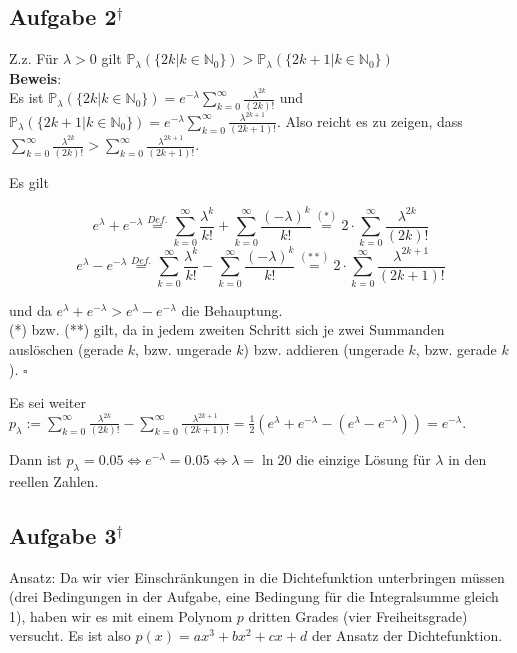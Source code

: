 \documentclass[11pt,a4paper,ngerman]{article}
\newcommand{\set}[1]{ \{ #1 \}}
\newcommand{\Prob}{\mathbb{P}}
\newcommand{\alex}{$^\dagger$}
\begin{document}
\subsection*{Aufgabe 2\alex}
Z.z. Für $\lambda > 0$ gilt $\Prob_\lambda(\set{2k | k \in \mathbb{N}_0}) > \Prob_\lambda(\set{2k+1 | k \in \mathbb{N}_0})$ \\
\textbf{Beweis}: \\
Es ist $\Prob_\lambda(\set{2k | k \in \mathbb{N}_0}) = e^{-\lambda}\sum_{k = 0}^\infty \frac{\lambda^{2k}}{(2k)!}$ und $\Prob_\lambda(\set{2k+1 | k \in \mathbb{N}_0}) = e^{-\lambda}\sum_{k = 0}^\infty \frac{\lambda^{2k+1}}{(2k+1)!}$.
Also reicht es zu zeigen, dass $\sum_{k = 0}^\infty \frac{\lambda^{2k}}{(2k)!} > \sum_{k = 0}^\infty \frac{\lambda^{2k+1}}{(2k+1)!}$.

Es gilt

\begin{equation*}
 e^\lambda + e^{-\lambda} \stackrel{Def.}{=} \sum_{k=0}^\infty \frac{\lambda^k}{k!} + \sum_{k=0}^\infty \frac{(-\lambda)^k}{k!}
\stackrel{(*)}{=} 2\cdot\sum_{k=0}^\infty \frac{\lambda^{2k}}{(2k)!}
\end{equation*}
\begin{equation*}
e^\lambda - e^{-\lambda}  \stackrel{Def.}{=}   \sum_{k=0}^\infty \frac{\lambda^k}{k!} - \sum_{k=0}^\infty \frac{(-\lambda)^k}{k!} 
\stackrel{(**)}{=} 2\cdot\sum_{k=0}^\infty \frac{\lambda^{2k+1}}{(2k+1)!}
\end{equation*}

und da $e^\lambda + e^{-\lambda} > e^\lambda - e^{-\lambda}$ die Behauptung. \\
(*) bzw. (**) gilt, da in jedem zweiten Schritt sich je zwei Summanden auslöschen (gerade $k$, bzw. ungerade $k$) bzw. addieren (ungerade $k$, bzw. gerade $k$).
\mbox{} \hfill $\square$

Es sei weiter $p_\lambda := \sum_{k = 0}^\infty \frac{\lambda^{2k}}{(2k)!} - \sum_{k = 0}^\infty \frac{\lambda^{2k+1}}{(2k+1)!} = \frac{1}{2}\left(e^\lambda + e^{-\lambda} - (e^\lambda - e^{-\lambda})  \right)= e^{-\lambda}$.

Dann ist $p_\lambda = 0.05 \Leftrightarrow e^{-\lambda} = 0.05 \Leftrightarrow \lambda = \ln 20 $ die einzige Lösung für $\lambda$ in den reellen Zahlen.

\subsection*{Aufgabe 3\alex}
Ansatz: Da wir vier Einschränkungen in die Dichtefunktion unterbringen müssen (drei Bedingungen in der Aufgabe, eine Bedingung für die Integralsumme gleich 1), haben
wir es mit einem Polynom $p$ dritten Grades (vier Freiheitsgrade) versucht. Es ist also $p(x) = ax^3 + bx^2 + cx +d$ der Ansatz der Dichtefunktion.
\end{document}
